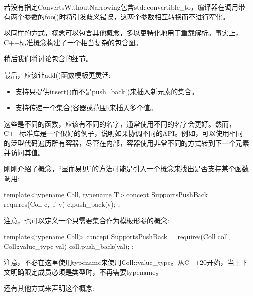 若没有指定ConvertsWithoutNarrowing包含std::convertible\_to，编译器在调用带有两个参数的foo()时将引发歧义错误，这两个参数相互转换而不进行窄化。

以同样的方式，概念可以包含其他概念，多以更特化地用于重载解析。事实上，C++标准概念构建了一个相当复杂的包含图。

稍后我们将讨论包含的细节。


最后，应该让add()函数模板更灵活:

\begin{itemize}
\item
支持只提供insert()而不是push\_back()来插入新元素的集合。

\item
支持传递一个集合(容器或范围)来插入多个值。
\end{itemize}

这些是不同的函数，应该有不同的名字，通常使用不同的名字会更好。然而，C++标准库是一个很好的例子，说明如果协调不同的API。例如，可以使用相同的泛型代码遍历所有容器，尽管在内部，容器使用非常不同的方式转到下一个元素并访问其值。


刚刚介绍了概念，“显而易见”的方法可能是引入一个概念来找出是否支持某个函数调用:

\begin{cpp}
template<typename Coll, typename T>
concept SupportsPushBack = requires(Coll c, T v) {
	c.push_back(v);
};
\end{cpp}

注意，也可以定义一个只需要集合作为模板形参的概念:

\begin{cpp}
template<typename Coll>
concept SupportsPushBack = requires(Coll coll, Coll::value_type val) {
	coll.push_back(val);
};
\end{cpp}

注意，不必在这里使用typename来使用Coll::value\_type。从C++20开始，当上下文明确限定成员必须是类型时，不再需要typename。

还有其他方式来声明这个概念:

